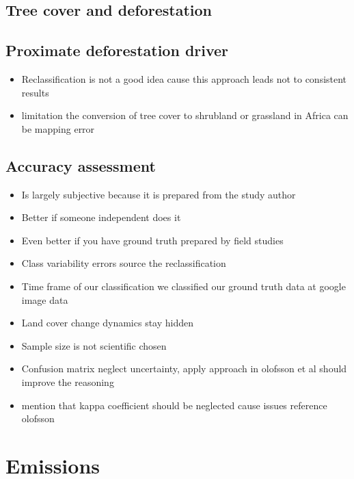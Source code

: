 		\subsection{Tree cover and deforestation}
		\label{subsec:discussion_tree_cover_and_deforestation}

		\subsection{Proximate deforestation driver}
		\label{subsec:discussion_proxy_deforestation_driver}
			\begin{itemize}
				\item Reclassification is not a good idea cause this approach leads not to consistent results
				\item limitation the conversion of tree cover to shrubland or grassland in Africa can be mapping error
			\end{itemize}

		\subsection{Accuracy assessment}
		\label{subsec:discussion_accuracy_assessment}
			\begin{itemize}
				\item Is largely subjective because it is prepared from the study author
				\item Better if someone independent does it 
				\item Even better if you have ground truth prepared by field studies
				\item Class variability errors source the reclassification
				\item Time frame of our classification we classified our ground truth data at google image data
				\item Land cover change dynamics stay hidden
				\item Sample size is not scientific chosen
				\item Confusion matrix neglect uncertainty, apply approach in olofsson et al should improve the reasoning
				\item mention that kappa coefficient should be neglected cause issues reference olofsson 
			\end{itemize}

	\section{Emissions}

